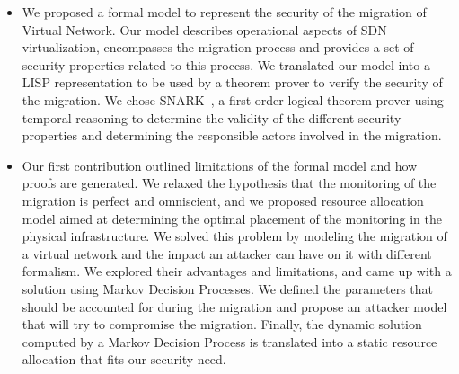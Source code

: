 \begin{itemize}
    \item We proposed a formal model to represent the security of the migration of Virtual Network.
    Our model describes operational aspects of SDN virtualization, encompasses the migration process and provides a set of security properties related to this process. We translated our model into a LISP representation to be used by a theorem prover to verify the security of the migration. We chose SNARK~\cite{snark-Stickel2000}, a first order logical theorem prover using temporal reasoning to determine the validity of the different security properties and determining the responsible actors involved in the migration.
    
    \item Our first contribution outlined limitations of the formal model and how proofs are generated. We relaxed the hypothesis that the monitoring of the migration is perfect and omniscient, and we proposed resource allocation model aimed at determining the optimal placement of the monitoring in the physical infrastructure. We solved this problem by modeling the migration of a virtual network and the impact an attacker can have on it with different formalism. We explored their advantages and limitations, and came up with a solution using Markov Decision Processes. We defined the parameters that should be accounted for during the migration and propose an attacker model that will try to compromise the migration. Finally, the dynamic solution computed by a Markov Decision Process is translated into a static resource allocation that fits our security need.
\end{itemize}


